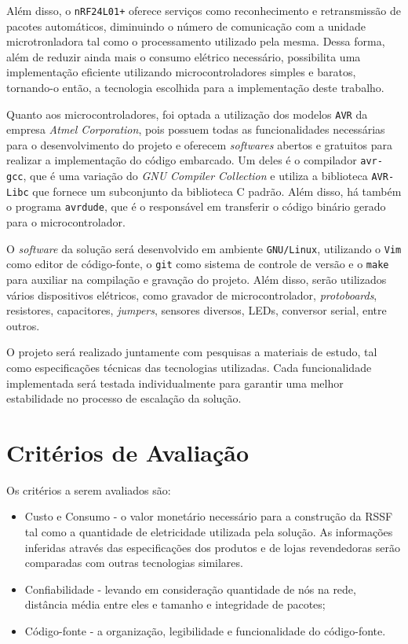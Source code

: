 \documentclass[
    12pt,               %
    a4paper,            %
    english,            %
    brazil,             %
    ]{article}
\begin{document}
Além disso, o \texttt{nRF24L01+} oferece serviços como reconhecimento e retransmissão de pacotes automáticos, diminuindo o número
de comunicação com a unidade microtronladora tal como o processamento utilizado pela mesma. Dessa forma, além de reduzir ainda
mais o consumo elétrico necessário, possibilita uma implementação eficiente utilizando microcontroladores simples e baratos,
tornando-o então, a tecnologia escolhida para a implementação deste trabalho.

Quanto aos microcontroladores, foi optada a utilização dos modelos \texttt{AVR} da empresa \textit{Atmel Corporation}, pois
possuem todas as funcionalidades necessárias para o desenvolvimento do projeto e oferecem \textit{softwares} abertos e gratuitos
para realizar a implementação do código embarcado. Um deles é o compilador \texttt{avr-gcc}, que é uma variação do \textit{GNU
Compiler Collection} e utiliza a biblioteca \texttt{AVR-Libc} que fornece um subconjunto da biblioteca C padrão. Além disso, há
também o programa \texttt{avrdude}, que é o responsável em transferir o código binário gerado para o microcontrolador.

O \textit{software} da solução será desenvolvido em ambiente \texttt{GNU/Linux}, utilizando o \texttt{Vim} como editor de
código-fonte, o \texttt{git} como sistema de controle de versão e o \texttt{make} para auxiliar na compilação e gravação do
projeto. Além disso, serão utilizados vários dispositivos elétricos, como gravador de microcontrolador, \textit{protoboards},
resistores, capacitores, \textit{jumpers}, sensores diversos, LEDs, conversor serial, entre outros.

O projeto será realizado juntamente com pesquisas a materiais de estudo, tal como especificações técnicas das tecnologias
utilizadas. Cada funcionalidade implementada será testada individualmente para garantir uma melhor estabilidade no processo de
escalação da solução.


\section{Critérios de Avaliação}

Os critérios a serem avaliados são:
\begin{itemize}
	\item Custo e Consumo - o valor monetário necessário para a construção da RSSF tal como a quantidade de eletricidade
	utilizada pela solução. As informações inferidas através das especificações dos produtos e de lojas revendedoras serão
	comparadas com outras tecnologias similares.
	\item Confiabilidade - levando em consideração quantidade de nós na rede, distância média entre eles e tamanho e integridade de pacotes;
	\item Código-fonte - a organização, legibilidade e funcionalidade do código-fonte.
\end{itemize}
\end{document}
